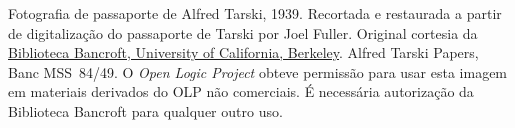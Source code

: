 Fotografia de passaporte de Alfred Tarski, 1939. Recortada e restaurada a partir de
digitalização do passaporte de Tarski por Joel Fuller. Original cortesia da
\href{http://www.lib.berkeley.edu/libraries/bancroft-library}{Biblioteca Bancroft,
University of California, Berkeley}. Alfred Tarski Papers,
Banc MSS~84/49. O \emph{Open Logic Project} obteve permissão para usar
esta imagem em materiais derivados do OLP não comerciais.
É necessária autorização da Biblioteca Bancroft para qualquer outro
uso.
